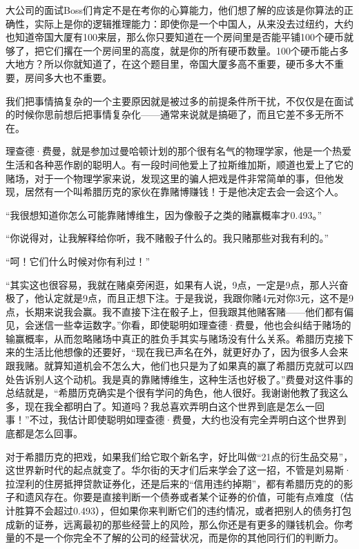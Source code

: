 大公司的面试Boss们肯定不是在考你的心算能力，他们想了解的应该是你算法的正确性，实际上是你的逻辑推理能力：即使你是一个中国人，从来没去过纽约，大约也知道帝国大厦有100来层，那么你只要知道在一个房间里是否能平铺100个硬币就够了，把它们撂在一个房间里的高度，就是你的所有硬币数量。100个硬币能占多大地方？所以你就知道了，在这个题目里，帝国大厦多高不重要，硬币多大不重要，房间多大也不重要。

我们把事情搞复杂的一个主要原因就是被过多的前提条件所干扰，不仅仅是在面试的时候你思前想后把事情复杂化------通常来说就是搞砸了，而且它差不多无所不在。

理查德·费曼，就是参加过曼哈顿计划的那个很有名气的物理学家，他是一个热爱生活和各种恶作剧的聪明人。有一段时间他爱上了拉斯维加斯，顺道也爱上了它的赌场，对于一个物理学家来说，发现这里的骗人把戏是件非常简单的事，但他发现，居然有一个叫希腊历克的家伙在靠赌博赚钱！于是他决定去会一会这个人。

``我很想知道你怎么可能靠赌博维生，因为像骰子之类的赌赢概率才0.493。''

``你说得对，让我解释给你听，我不赌骰子什么的。我只赌那些对我有利的。''

``呵！它们什么时候对你有利过！''

``其实这也很容易，我就在赌桌旁闲逛，如果有人说，9点，一定是9点，那人兴奋极了，他认定就是9点，而且正想下注。于是我说，我跟你赌4元对你3元，这不是9点，长期来说我会赢。我不直接下注在骰子上，但我跟其他赌客赌------他们都有偏见，会迷信一些幸运数字。''你看，即使聪明如理查德·费曼，他也会纠结于赌场的输赢概率，从而忽略赌场中真正的胜负手其实与赌场没有什么关系。希腊历克接下来的生活比他想像的还要好，``现在我已声名在外，就更好办了，因为很多人会来跟我赌。就算知道机会不怎么大，他们也只是为了如果真的赢了希腊历克就可以四处告诉别人这个动机。我是真的靠赌博维生，这种生活也好极了。''费曼对这件事的总结就是，``希腊历克确实是个很有学问的角色，他人很好。我谢谢他教了我这么多，现在我全都明白了。知道吗？我总喜欢弄明白这个世界到底是怎么一回事！''不过，我估计即使聪明如理查德·费曼，大约也没有完全弄明白这个世界到底都是怎么回事。

对于希腊历克的把戏，如果我们给它取个新名字，好比叫做``21点的衍生品交易''，这世界新时代的起点就变了。华尔街的天才们后来学会了这一招，不管是刘易斯·拉涅利的住房抵押贷款证券化，还是后来的``信用违约掉期''，都有希腊历克的的影子和遗风存在。你要是直接判断一个债券或者某个证券的价值，可能有点难度（估计胜算不会超过0.493），但如果你来判断它们的违约情况，或者把别人的债务打包成新的证券，远离最初的那些经营上的风险，那么你还是有更多的赚钱机会。你考量的不是一个你完全不了解的公司的经营状况，而是你的其他同行们的判断力。

